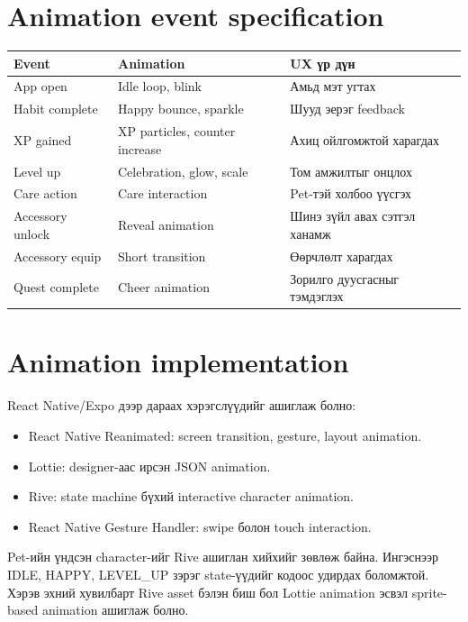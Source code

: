 \documentclass[12pt,a4paper,oneside]{report}
\begin{document}
\section{Animation event specification}
\begin{longtable}{p{}p{}p{}}
\toprule
\textbf{Event} & \textbf{Animation} & \textbf{UX үр дүн}\\
\midrule
App open & Idle loop, blink & Амьд мэт угтах\\
Habit complete & Happy bounce, sparkle & Шууд эерэг feedback\\
XP gained & XP particles, counter increase & Ахиц ойлгомжтой харагдах\\
Level up & Celebration, glow, scale & Том амжилтыг онцлох\\
Care action & Care interaction & Pet-тэй холбоо үүсгэх\\
Accessory unlock & Reveal animation & Шинэ зүйл авах сэтгэл ханамж\\
Accessory equip & Short transition & Өөрчлөлт харагдах\\
Quest complete & Cheer animation & Зорилго дуусгасныг тэмдэглэх\\
\bottomrule
\end{longtable}

\section{Animation implementation}
React Native/Expo дээр дараах хэрэгслүүдийг ашиглаж болно:
\begin{itemize}
  \item React Native Reanimated: screen transition, gesture, layout animation.
  \item Lottie: designer-аас ирсэн JSON animation.
  \item Rive: state machine бүхий interactive character animation.
  \item React Native Gesture Handler: swipe болон touch interaction.
\end{itemize}
Pet-ийн үндсэн character-ийг Rive ашиглан хийхийг зөвлөж байна. Ингэснээр IDLE, HAPPY, LEVEL\_UP зэрэг state-үүдийг кодоос удирдах боломжтой. Хэрэв эхний хувилбарт Rive asset бэлэн биш бол Lottie animation эсвэл sprite-based animation ашиглаж болно.
\end{document}
